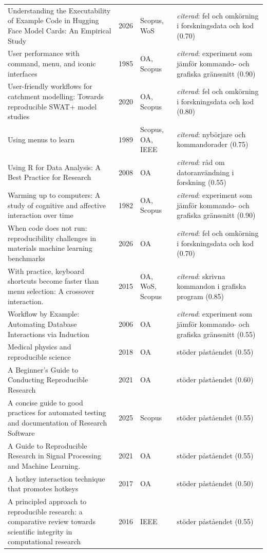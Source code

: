 \begin{longtable}{@{}%
  >{\raggedright\arraybackslash}p{}c%
  >{\raggedright\arraybackslash}p{}%
  >{\raggedright\arraybackslash}p{}@{}}
Understanding the Executability of Example Code in Hugging Face Model Cards: An Empirical Study & 2026 & Scopus, WoS & \emph{citerad}: fel och omkörning i forskningsdata och kod (0.70) \\
User performance with command, menu, and iconic interfaces & 1985 & OA, Scopus & \emph{citerad}: experiment som jämför kommando- och grafiska gränssnitt (0.90) \\
User-friendly workflows for catchment modelling: Towards reproducible SWAT+ model studies & 2020 & OA, Scopus & \emph{citerad}: fel och omkörning i forskningsdata och kod (0.80) \\
Using menus to learn & 1989 & Scopus, OA, IEEE & \emph{citerad}: nybörjare och kommandorader (0.75) \\
Using R for Data Analysis: A Best Practice for Research & 2008 & OA & \emph{citerad}: råd om datoranvändning i forskning (0.55) \\
Warming up to computers: A study of cognitive and affective interaction over time & 1982 & OA, Scopus & \emph{citerad}: experiment som jämför kommando- och grafiska gränssnitt (0.90) \\
When code does not run: reproducibility challenges in materials machine learning benchmarks & 2026 & OA & \emph{citerad}: fel och omkörning i forskningsdata och kod (0.70) \\
With practice, keyboard shortcuts become faster than menu selection: A crossover interaction. & 2015 & OA, WoS, Scopus & \emph{citerad}: skrivna kommandon i grafiska program (0.85) \\
Workflow by Example: Automating Database Interactions via Induction & 2006 & OA & \emph{citerad}: experiment som jämför kommando- och grafiska gränssnitt (0.55) \\
67 Medical physics and reproducible science & 2018 & OA & stöder påståendet (0.55) \\
A Beginner's Guide to Conducting Reproducible Research & 2021 & OA & stöder påståendet (0.60) \\
A concise guide to good practices for automated testing and documentation of Research Software & 2025 & Scopus & stöder påståendet (0.55) \\
A Guide to Reproducible Research in Signal Processing and Machine Learning. & 2021 & OA & stöder påståendet (0.55) \\
A hotkey interaction technique that promotes hotkeys & 2017 & OA & stöder påståendet (0.50) \\
A principled approach to reproducible research: a comparative review towards scientific integrity in computational research & 2016 & IEEE & stöder påståendet (0.55) \\

\end{longtable}
